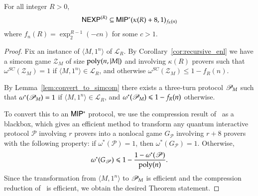 \begin{theorem}[Main]
	For all integer $R > 0$, 
	\[
		{\sf NEXP}^{(R)} \subseteq {\sf MIP^*}(\kappa(R)+8,1)_{f_R(n)}
	\]
	 where $f_n(R) = \exp^{R-1}_2(-cn)$ for some $c > 1$.
\end{theorem}
\begin{proof}
	Fix an instance of $\langle M,1^n \rangle$ of $\mathcal{L}_R$. By Corollary~\ref{cor:recursive_enl} we have a simcom game $\mathscr{Z}_M$  of size $\operatorname{poly}(n,|M|)$ and involving $\kappa(R)$ provers such that $\omega^{SC}(\mathscr{Z}_M) = 1$ if $\langle M,1^n \rangle \in \mathcal{L}_R$, and otherwise $\omega^{SC}(\mathscr{Z}_M) \leq 1 - f_R(n)$. 
	
	By Lemma~\ref{lem:convert_to_simcom} there exists a three-turn protocol $\mathscr{P}_M$ such that $\omega^*(\mathscr{P}_M) = 1$ if $\langle M,1^n \rangle \in \mathcal{L}_R$, and $\omega^*(\mathscr{P}_M) \leqslant 1 - f_R(n)$ otherwise.
	
	To convert this to an ${\sf MIP^*}$ protocol, we use the compression result of~\cite{ji2016compression} as a blackbox, which gives an efficient method to transform any quantum interactive protocol $\mathscr{P}$ involving $r$ provers into a nonlocal game $G_{\mathscr{P}}$ involving $r + 8$ provers with the following property: if $\omega^*(\mathscr{P}) = 1$, then $\omega^*(G_{\mathscr{P}}) = 1$. Otherwise, 
	\[
		\omega^*(G_{\mathscr{P}}) \leqslant 1 - \frac{1 - \omega^*(\mathscr{P})}{\operatorname{poly}(n)}. 
	\]
	Since the transformation from $\langle M,1^n \rangle$ to $\mathscr{P}_M$ is efficient and the compression reduction of~\cite{ji2016compression} is efficient, we obtain the desired Theorem statement.
\end{proof}

